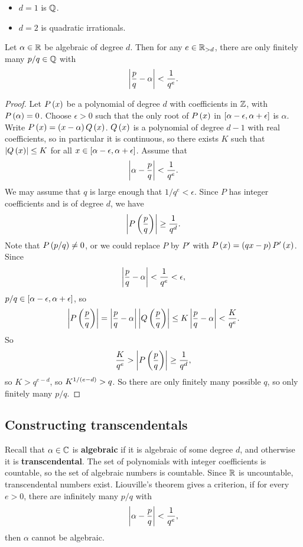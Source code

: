 \begin{example*}
\hfill
\begin{itemize}
\item $ d = 1 $ is $ \Q $.
\item $ d = 2 $ is quadratic irrationals.
\end{itemize}
\end{example*}

\begin{theorem}
Let $ \alpha \in \R $ be algebraic of degree $ d $. Then for any $ e \in \R_{> d} $, there are only finitely many $ p / q \in \Q $ with
$$ \abs{\dfrac{p}{q} - \alpha} < \dfrac{1}{q^e}. $$
\end{theorem}

\begin{proof}
Let $ P\rb{x} $ be a polynomial of degree $ d $ with coefficients in $ \Z $, with $ P\rb{\alpha} = 0 $. Choose $ \epsilon > 0 $ such that the only root of $ P\rb{x} $ in $ \sb{\alpha - \epsilon, \alpha + \epsilon} $ is $ \alpha $. Write $ P\rb{x} = \rb{x - \alpha}Q\rb{x} $. $ Q\rb{x} $ is a polynomial of degree $ d - 1 $ with real coefficients, so in particular it is continuous, so there exists $ K $ such that $ \abs{Q\rb{x}} \le K $ for all $ x \in \sb{\alpha - \epsilon, \alpha + \epsilon} $. Assume that
$$ \abs{\alpha - \dfrac{p}{q}} < \dfrac{1}{q^e}. $$
We may assume that $ q $ is large enough that $ 1 / q^e < \epsilon $. Since $ P $ has integer coefficients and is of degree $ d $, we have
$$ \abs{P\rb{\dfrac{p}{q}}} \ge \dfrac{1}{q^d}. $$
Note that $ P\rb{p / q} \ne 0 $, or we could replace $ P $ by $ P' $ with $ P\rb{x} = \rb{qx - p}P'\rb{x} $. Since
$$ \abs{\dfrac{p}{q} - \alpha} < \dfrac{1}{q^e} < \epsilon, $$
$ p / q \in \sb{\alpha - \epsilon, \alpha + \epsilon} $, so
$$ \abs{P\rb{\dfrac{p}{q}}} = \abs{\dfrac{p}{q} - \alpha} \abs{Q\rb{\dfrac{p}{q}}} \le K \abs{\dfrac{p}{q} - \alpha} < \dfrac{K}{q^e}. $$
So
$$ \dfrac{K}{q^e} > \abs{P\rb{\dfrac{p}{q}}} \ge \dfrac{1}{q^d}, $$
so $ K > q^{e - d} $, so $ K^{1 / \rb{e - d}} > q $. So there are only finitely many possible $ q $, so only finitely many $ p / q $.
\end{proof}

\subsection{Constructing transcendentals}

Recall that $ \alpha \in \C $ is \textbf{algebraic} if it is algebraic of some degree $ d $, and otherwise it is \textbf{transcendental}. The set of polynomials with integer coefficients is countable, so the set of algebraic numbers is countable. Since $ \R $ is uncountable, transcendental numbers exist. Liouville's theorem gives a criterion, if for every $ e > 0 $, there are infinitely many $ p / q $ with
$$ \abs{\alpha - \dfrac{p}{q}} < \dfrac{1}{q^e}, $$
then $ \alpha $ cannot be algebraic.

